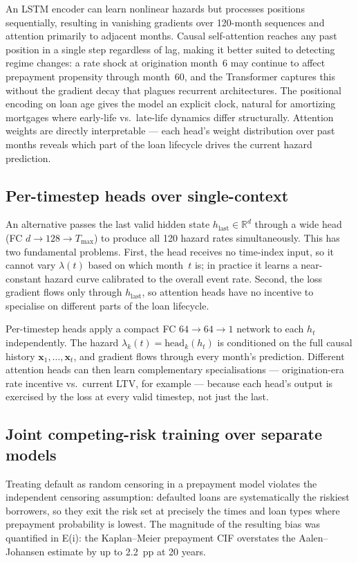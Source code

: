 \documentclass[11pt,a4paper]{article}
\begin{document}
An LSTM encoder can learn nonlinear hazards but processes positions sequentially, resulting in vanishing gradients over 120-month sequences and attention primarily to adjacent months.
Causal self-attention reaches any past position in a single step regardless of lag, making it better suited to detecting regime changes: a rate shock at origination month~6 may continue to affect prepayment propensity through month~60, and the Transformer captures this without the gradient decay that plagues recurrent architectures.
The positional encoding on loan age gives the model an explicit clock, natural for amortizing mortgages where early-life vs.\ late-life dynamics differ structurally.
Attention weights are directly interpretable --- each head's weight distribution over past months reveals which part of the loan lifecycle drives the current hazard prediction.

\subsection{Per-timestep heads over single-context}

An alternative passes the last valid hidden state $h_{\text{last}} \in \mathbb{R}^d$ through a wide head (FC $d\!\to\!128\!\to\!T_{\max}$) to produce all 120 hazard rates simultaneously.
This has two fundamental problems.
First, the head receives no time-index input, so it cannot vary $\lambda(t)$ based on which month~$t$ is; in practice it learns a near-constant hazard curve calibrated to the overall event rate.
Second, the loss gradient flows only through $h_{\text{last}}$, so attention heads have no incentive to specialise on different parts of the loan lifecycle.

Per-timestep heads apply a compact FC $64\!\to\!64\!\to\!1$ network to each $h_t$ independently.
The hazard $\lambda_k(t) = \text{head}_k(h_t)$ is conditioned on the full causal history $\mathbf{x}_1,\ldots,\mathbf{x}_t$, and gradient flows through every month's prediction.
Different attention heads can then learn complementary specialisations --- origination-era rate incentive vs.\ current LTV, for example --- because each head's output is exercised by the loss at every valid timestep, not just the last.

\subsection{Joint competing-risk training over separate models}

Treating default as random censoring in a prepayment model violates the independent censoring assumption: defaulted loans are systematically the riskiest borrowers, so they exit the risk set at precisely the times and loan types where prepayment probability is lowest.
The magnitude of the resulting bias was quantified in E(i): the Kaplan--Meier prepayment CIF overstates the Aalen--Johansen estimate by up to 2.2~pp at 20 years.
\end{document}
